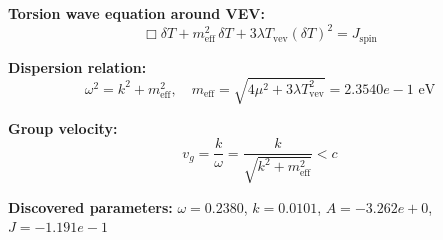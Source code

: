 
\textbf{Torsion wave equation around VEV:}
\begin{equation}
  \Box \delta T + m_{\text{eff}}^2 \, \delta T + 3\lambda T_{\text{vev}} (\delta T)^2 = J_{\text{spin}}
\end{equation}

\textbf{Dispersion relation:}
\begin{equation}
  \omega^2 = k^2 + m_{\text{eff}}^2, \quad
  m_{\text{eff}} = \sqrt{4\mu^2 + 3\lambda T_{\text{vev}}^2} = 2.3540e-1 \text{ eV}
\end{equation}

\textbf{Group velocity:}
\begin{equation}
  v_g = \frac{k}{\omega} = \frac{k}{\sqrt{k^2 + m_{\text{eff}}^2}} < c
\end{equation}

\textbf{Discovered parameters:}
$\omega = 0.2380$, \quad
$k = 0.0101$, \quad
$A = -3.262e+0$, \quad
$J = -1.191e-1$
